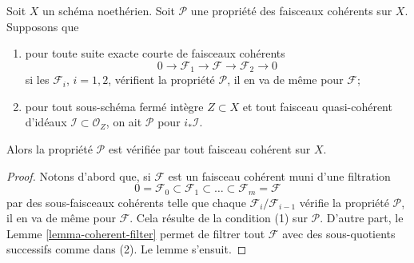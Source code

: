\begin{lemma}
\label{lemma-property-initial}
Soit $X$ un schéma noethérien.
Soit $\mathcal{P}$ une propriété des faisceaux cohérents sur $X$. Supposons que
\begin{enumerate}
\item pour toute suite exacte courte de faisceaux cohérents
$$
0 \to \mathcal{F}_1 \to \mathcal{F} \to \mathcal{F}_2 \to 0
$$
si les $\mathcal{F}_i$, $i = 1, 2$, vérifient la propriété $\mathcal{P}$,
il en va de même pour $\mathcal{F}$;
\item pour tout sous-schéma fermé intègre $Z \subset X$
et tout faisceau quasi-cohérent d'idéaux
$\mathcal{I} \subset \mathcal{O}_Z$, on ait
$\mathcal{P}$ pour $i_*\mathcal{I}$.
\end{enumerate}
Alors la propriété $\mathcal{P}$ est vérifiée par tout faisceau cohérent
sur $X$.
\end{lemma}

\begin{proof}
Notons d'abord que, si $\mathcal{F}$ est un faisceau cohérent muni d'une filtration
$$
0 = \mathcal{F}_0 \subset \mathcal{F}_1 \subset
\ldots \subset \mathcal{F}_m = \mathcal{F}
$$
par des sous-faisceaux cohérents telle que chaque $\mathcal{F}_i/\mathcal{F}_{i - 1}$
vérifie la propriété $\mathcal{P}$, il en va de même pour $\mathcal{F}$.
Cela résulte de la condition (1) sur $\mathcal{P}$.
D'autre part, le Lemme \ref{lemma-coherent-filter}
permet de filtrer tout $\mathcal{F}$
avec des sous-quotients successifs comme dans (2).
Le lemme s'ensuit.
\end{proof}

